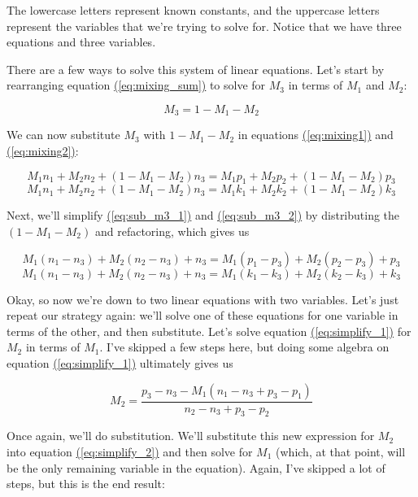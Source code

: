 \documentclass{article}
\newcommand{\refeq}[1]{\hyperref[eq:#1]{(\ref{eq:#1})}}
\begin{document}
The lowercase letters represent known constants, and the uppercase letters represent the variables that we're trying to solve for. Notice that we have three equations and three variables.

There are a few ways to solve this system of linear equations. Let's start by rearranging equation \refeq{mixing_sum} to solve for $M_3$ in terms of $M_1$ and $M_2$:

\begin{equation}
    \label{eq:solve_m3}
    M_3 = 1 - M_1 - M_2
\end{equation}

We can now substitute $M_3$ with $1 - M_1 - M_2$ in equations \refeq{mixing1} and \refeq{mixing2}:

\begin{equation}
    \label{eq:sub_m3_1}
    M_1n_1 + M_2n_2 + (1 - M_1 - M_2)n_3 = M_1p_1 + M_2p_2 + (1 - M_1 - M_2)p_3
\end{equation}
\begin{equation}
    \label{eq:sub_m3_2}
    M_1n_1 + M_2n_2 + (1 - M_1 - M_2)n_3 = M_1k_1 + M_2k_2 + (1 - M_1 - M_2)k_3
\end{equation}

Next, we'll simplify \refeq{sub_m3_1} and \refeq{sub_m3_2} by distributing the $(1 - M_1 - M_2)$ and refactoring, which gives us


\begin{equation}
    \label{eq:simplify_1}
    M_1(n_1 - n_3) + M_2(n_2 - n_3) + n_3 = M_1(p_1 - p_3) + M_2(p_2 - p_3) + p_3
\end{equation}
\begin{equation}
    \label{eq:simplify_2}
    M_1(n_1 - n_3) + M_2(n_2 - n_3) + n_3 = M_1(k_1 - k_3) + M_2(k_2 - k_3) + k_3
\end{equation}

Okay, so now we're down to two linear equations with two variables. Let's just repeat our strategy again: we'll solve one of these equations for one variable in terms of the other, and then substitute. Let's solve equation \refeq{simplify_1} for $M_2$ in terms of $M_1$. I've skipped a few steps here, but doing some algebra on equation \refeq{simplify_1} ultimately gives us

\begin{equation}
    \label{eq:solve_m2}
    M_2 = \frac{p_3 - n_3 - M_1(n_1 - n_3 + p_3 - p_1)}{n_2 - n_3 + p_3 - p_2}
\end{equation}

Once again, we'll do substitution. We'll substitute this new expression for $M_2$ into equation \refeq{simplify_2} and then solve for $M_1$ (which, at that point, will be the only remaining variable in the equation). Again, I've skipped a lot of steps, but this is the end result:
\end{document}
